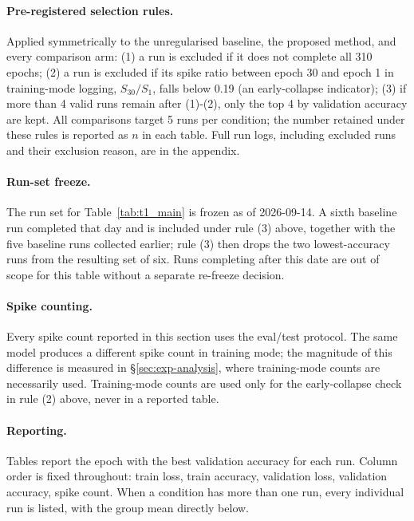 \paragraph{Pre-registered selection rules.} Applied symmetrically to the
unregularised baseline, the proposed method, and every comparison arm: (1) a
run is excluded if it does not complete all 310 epochs; (2) a run is
excluded if its spike ratio between epoch 30 and epoch 1 in training-mode
logging, $S_{30}/S_1$, falls below 0.19 (an early-collapse indicator); (3)
if more than 4 valid runs remain after (1)-(2), only the top 4 by
validation accuracy are kept. All comparisons target 5 runs per condition;
the number retained under these rules is reported as $n$ in each table.
Full run logs, including excluded runs and their exclusion reason, are in
the appendix.

\paragraph{Run-set freeze.} The run set for Table~\ref{tab:t1_main} is
frozen as of 2026-09-14. A sixth baseline run completed that day and is
included under rule (3) above, together with the five baseline runs
collected earlier; rule (3) then drops the two lowest-accuracy runs from
the resulting set of six. Runs completing after this date are out of scope
for this table without a separate re-freeze decision.

\paragraph{Spike counting.} Every spike count reported in this section uses
the eval/test protocol. The same model produces a different spike count in
training mode; the magnitude of this difference is measured in \S\ref{sec:exp-analysis},
where training-mode counts are necessarily used. Training-mode counts are used
only for the early-collapse check in rule (2) above, never in a reported table.

\paragraph{Reporting.} Tables report the epoch with the best validation
accuracy for each run. Column order is fixed throughout: train loss, train
accuracy, validation loss, validation accuracy, spike count. When a
condition has more than one run, every individual run is listed, with the
group mean directly below.

